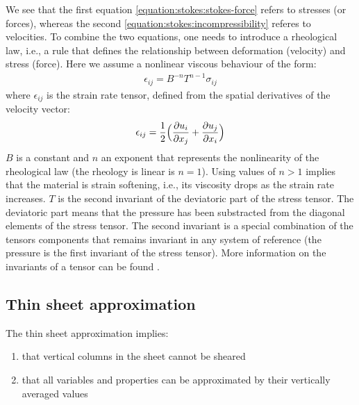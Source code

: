 \documentclass[letterpaper,10pt,english]{jupyterBook}
\begin{document}
\sphinxAtStartPar
We see that the first equation \eqref{equation:stokes:stokes-force} refers to stresses (or forces), whereas the second \eqref{equation:stokes:incompressibility} referes to velocities. To combine the two equations, one needs to introduce a rheological law, i.e., a rule that defines the relationship between deformation (velocity) and stress (force). Here we assume a non\sphinxhyphen{}linear viscous behaviour of the form:
\begin{equation}\label{equation:stokes:rheology}
\begin{split}\epsilon_{ij} = B^{-n}T^{n-1}\sigma_{ij}\end{split}
\end{equation}
\sphinxAtStartPar
where \(\epsilon_{ij}\) is the strain rate tensor, defined from the spatial derivatives of the velocity vector:
\begin{equation}\label{equation:stokes:strain-rate}
\begin{split}\epsilon_{ij}=\frac{1}{2}\Bigl(\frac{\partial u_i}{\partial x_j}+\frac{\partial u_j}{\partial x_i}\Bigr)\end{split}
\end{equation}
\sphinxAtStartPar
\(B\) is a constant and \(n\) an exponent that represents the non\sphinxhyphen{}linearity of the rheological law (the rheology is linear is \(n=1\)). Using values of \(n>1\) implies that the material is strain softening, i.e., its viscosity drops as the strain rate increases. \(T\) is the second invariant of the deviatoric part of the stress tensor. The deviatoric part means that the pressure has been substracted from the diagonal elements of the stress tensor. The second invariant is a special combination of the tensors components that remains invariant in any system of reference (the pressure is the first invariant of the stress tensor). More information on the invariants of a tensor can be found .

\sphinxstepscope


\subsection{Thin sheet approximation}
\label{\detokenize{approx:thin-sheet-approximation}}\label{\detokenize{approx::doc}}
\sphinxAtStartPar
The thin sheet approximation implies:
\begin{enumerate}
%
\item {} 
\sphinxAtStartPar
that vertical columns in the sheet cannot be sheared

\item {} 
\sphinxAtStartPar
that all variables and properties can be approximated by their vertically averaged values

\end{enumerate}
\end{document}
